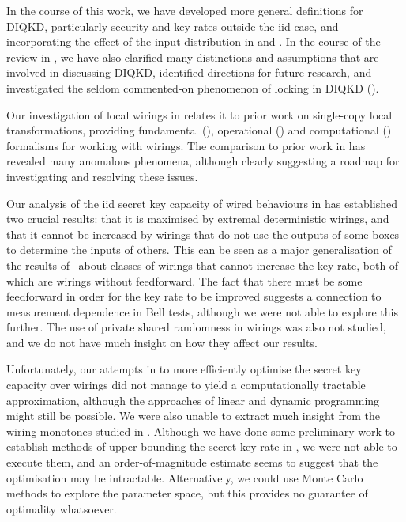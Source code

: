 \documentclass[10pt, a4paper]{article}
\numberwithin{equation}{section} %
\theoremstyle{definition}
\theoremstyle{plain}
\newcommand{\?}{\mathrel{?}} %
\begin{document}
                  In the course of this work, we have developed more general definitions for DIQKD, particularly security and key rates outside the iid case, and incorporating the effect of the input distribution in  and . In the course of the review in , we have also clarified many distinctions and assumptions that are involved in discussing DIQKD, identified directions for future research, and investigated the seldom commented-on phenomenon of locking in DIQKD ().

                  Our investigation of local wirings in  relates it to prior work on single-copy local transformations, providing fundamental (), operational () and computational () formalisms for working with wirings. The comparison to prior work in  has revealed many anomalous phenomena, although clearly suggesting a roadmap for investigating and resolving these issues.

                  Our analysis of the iid secret key capacity of wired behaviours in  has established two crucial results: that it is maximised by extremal deterministic wirings, and that it cannot be increased by wirings that do not use the outputs of some boxes to determine the inputs of others. This can be seen as a major generalisation of the results of~\cite{JanLiThesis} about classes of wirings that cannot increase the key rate, both of which are wirings without feedforward. The fact that there must be some feedforward in order for the key rate to be improved suggests a connection to measurement dependence in Bell tests, although we were not able to explore this further. The use of private shared randomness in wirings was also not studied, and we do not have much insight on how they affect our results.

                  Unfortunately, our attempts in  to more efficiently optimise the secret key capacity over wirings did not manage to yield a computationally tractable approximation, although the approaches of linear and dynamic programming might still be possible. We were also unable to extract much insight from the wiring monotones studied in . Although we have done some preliminary work to establish methods of upper bounding the secret key rate in , we were not able to execute them, and an order-of-magnitude estimate seems to suggest that the optimisation may be intractable. Alternatively, we could use Monte Carlo methods to explore the parameter space, but this provides no guarantee of optimality whatsoever.
\end{document}

